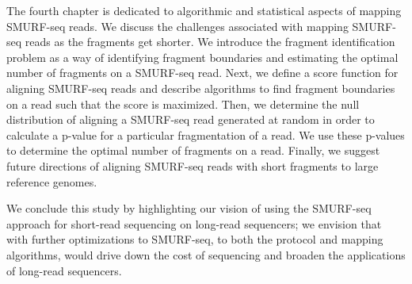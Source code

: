 The fourth chapter is dedicated to algorithmic and statistical aspects
of mapping SMURF-seq reads. We discuss the challenges associated with
mapping SMURF-seq reads as the fragments get shorter.
%
We introduce the fragment identification problem as a way of identifying
fragment boundaries and estimating the optimal number of fragments on a
SMURF-seq read.
%
Next, we define a score function for aligning SMURF-seq reads and
describe algorithms to find fragment boundaries on a read such that the
score is maximized.
%
Then, we determine the null distribution of aligning a SMURF-seq read
generated at random in order to calculate a p-value for a particular
fragmentation of a read. We use these p-values to determine the optimal
number of fragments on a read.
%
Finally, we suggest future directions of aligning SMURF-seq reads with
short fragments to large reference genomes.

We conclude this study by highlighting our vision of using the SMURF-seq
approach for short-read sequencing on long-read sequencers; we envision
that with further optimizations to SMURF-seq, to both the protocol and
mapping algorithms, would drive down the cost of sequencing and broaden
the applications of long-read sequencers.
